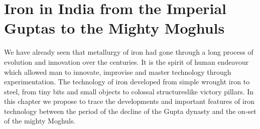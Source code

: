 
\chapter{Iron in India from the Imperial Guptas to the Mighty Moghuls}

We have already seen that metallurgy of iron had gone through a long process of evolution and innovation over the centuries. It is the spirit of human endeavour which allowed man to innovate, improvise and master technology through experimentation. The technology of iron developed from simple wrought iron to steel, from tiny bits and small objects to colossal structureslike victory pillars. In this chapter we propose to trace the developments and important features of iron technology between the period of the decline of the Gupta dynasty and the on-set of the mighty Moghuls.

